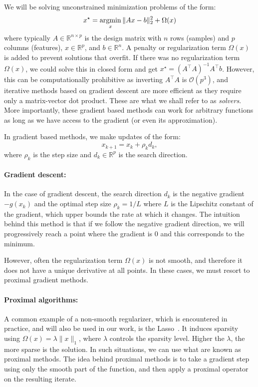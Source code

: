 We will be solving unconstrained minimization problems of the form:
\begin{equation}
x^{\star} = \mathop{\mathrm{argmin}}_x \|Ax - b\|_{2}^2 + \Omega(x)
\end{equation}
\label{eq:linreg_minimize}
%
where typically $A \in \mathbb{R}^{n \times p}$ is the design matrix with $n$ rows (samples) and $p$ columns (features), $x \in \mathbb{R}^p$, and $b \in \mathbb{R}^n$. A penalty or regularization term $\Omega(x)$ is added to prevent solutions that overfit. 
If there was no regularization term $\Omega(x)$, we could solve this in closed form and get $x^{\star} = {(A^{\top}A)}^{-1}A^{\top}b$. However, this can be computationally prohibitive as inverting $A^{\top}A$ is $\mathcal{O}(p^3)$, and iterative methods based on gradient descent are more efficient as they require only a matrix-vector dot product. These are what we shall refer to as \emph{solvers}. More importantly, these gradient based methods can work for arbitrary functions as long as we have access to the gradient (or even its approximation).

In gradient based methods, we make updates of the  form:
%
\begin{equation}
x_{k + 1} = x_{k} + \rho_k d_k,
\end{equation}
\label{eq:update_term}
%
where $\rho_k$ is the step size and $d_k \in \mathbb{R}^p$ is the search direction.

\paragraph{Gradient descent: } In the case of gradient descent, the search direction $d_k$ is the negative gradient $-g(x_k)$ and the optimal step size $\rho_k=1/L$ where $L$ is the Lipschitz constant of the gradient, which upper bounds the rate at which it changes. The intuition behind this method is that if we follow the negative gradient direction, we will progressively reach a point where the gradient is 0 and this corresponds to the minimum.

However, often the regularization term $\Omega(x)$ is not smooth, and therefore it does not have a unique derivative at all points. In these cases, we must resort to proximal gradient methods.

\paragraph{Proximal algorithms: } A common example of a non-smooth regularizer, which is encountered in practice, and will also be used in our work, is the Lasso~\citep{tibshirani1996regression}. It induces sparsity using $\Omega(x) = \lambda \|x\|_1$, where $\lambda$ controls the sparsity level. Higher the $\lambda$, the more sparse is the solution. In such situations, we can use what are known as proximal methods. The idea behind proximal methods is to take a gradient step using only the smooth part of the function, and then apply a proximal operator on the resulting iterate. 

